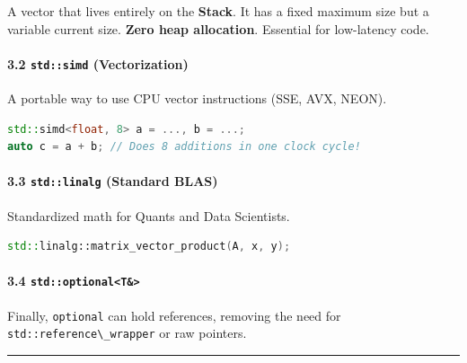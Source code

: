 A vector that lives entirely on the \textbf{Stack}. It has a fixed
maximum size but a variable current size. \textbf{Zero heap allocation}.
Essential for low-latency code.

\hypertarget{stdsimd-vectorization}{%
\paragraph{\texorpdfstring{3.2 \texttt{std::simd}
(Vectorization)}{3.2 std::simd (Vectorization)}}\label{stdsimd-vectorization}}

A portable way to use CPU vector instructions (SSE, AVX, NEON).

\begin{lstlisting}[language={C++}]
std::simd<float, 8> a = ..., b = ...;
auto c = a + b; // Does 8 additions in one clock cycle!
\end{lstlisting}

\hypertarget{stdlinalg-standard-blas}{%
\paragraph{\texorpdfstring{3.3 \texttt{std::linalg} (Standard
BLAS)}{3.3 std::linalg (Standard BLAS)}}\label{stdlinalg-standard-blas}}

Standardized math for Quants and Data Scientists.

\begin{lstlisting}[language={C++}]
std::linalg::matrix_vector_product(A, x, y);
\end{lstlisting}

\hypertarget{stdoptionalt}{%
\paragraph{\texorpdfstring{3.4
\texttt{std::optional\textless{}T\&\textgreater{}}}{3.4 std::optional\textless T\&\textgreater{}}}\label{stdoptionalt}}

Finally, \passthrough{\lstinline!optional!} can hold references,
removing the need for \passthrough{\lstinline!std::reference\_wrapper!}
or raw pointers.

\begin{center}\rule{0.5\linewidth}{0.5pt}\end{center}
